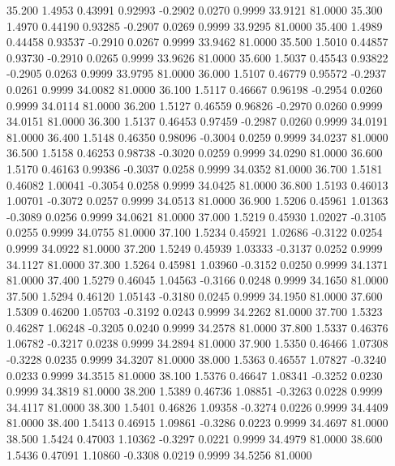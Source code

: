   35.200   1.4953   0.43991   0.92993  -0.2902   0.0270   0.9999  33.9121  81.0000
  35.300   1.4970   0.44190   0.93285  -0.2907   0.0269   0.9999  33.9295  81.0000
  35.400   1.4989   0.44458   0.93537  -0.2910   0.0267   0.9999  33.9462  81.0000
  35.500   1.5010   0.44857   0.93730  -0.2910   0.0265   0.9999  33.9626  81.0000
  35.600   1.5037   0.45543   0.93822  -0.2905   0.0263   0.9999  33.9795  81.0000
  36.000   1.5107   0.46779   0.95572  -0.2937   0.0261   0.9999  34.0082  81.0000
  36.100   1.5117   0.46667   0.96198  -0.2954   0.0260   0.9999  34.0114  81.0000
  36.200   1.5127   0.46559   0.96826  -0.2970   0.0260   0.9999  34.0151  81.0000
  36.300   1.5137   0.46453   0.97459  -0.2987   0.0260   0.9999  34.0191  81.0000
  36.400   1.5148   0.46350   0.98096  -0.3004   0.0259   0.9999  34.0237  81.0000
  36.500   1.5158   0.46253   0.98738  -0.3020   0.0259   0.9999  34.0290  81.0000
  36.600   1.5170   0.46163   0.99386  -0.3037   0.0258   0.9999  34.0352  81.0000
  36.700   1.5181   0.46082   1.00041  -0.3054   0.0258   0.9999  34.0425  81.0000
  36.800   1.5193   0.46013   1.00701  -0.3072   0.0257   0.9999  34.0513  81.0000
  36.900   1.5206   0.45961   1.01363  -0.3089   0.0256   0.9999  34.0621  81.0000
  37.000   1.5219   0.45930   1.02027  -0.3105   0.0255   0.9999  34.0755  81.0000
  37.100   1.5234   0.45921   1.02686  -0.3122   0.0254   0.9999  34.0922  81.0000
  37.200   1.5249   0.45939   1.03333  -0.3137   0.0252   0.9999  34.1127  81.0000
  37.300   1.5264   0.45981   1.03960  -0.3152   0.0250   0.9999  34.1371  81.0000
  37.400   1.5279   0.46045   1.04563  -0.3166   0.0248   0.9999  34.1650  81.0000
  37.500   1.5294   0.46120   1.05143  -0.3180   0.0245   0.9999  34.1950  81.0000
  37.600   1.5309   0.46200   1.05703  -0.3192   0.0243   0.9999  34.2262  81.0000
  37.700   1.5323   0.46287   1.06248  -0.3205   0.0240   0.9999  34.2578  81.0000
  37.800   1.5337   0.46376   1.06782  -0.3217   0.0238   0.9999  34.2894  81.0000
  37.900   1.5350   0.46466   1.07308  -0.3228   0.0235   0.9999  34.3207  81.0000
  38.000   1.5363   0.46557   1.07827  -0.3240   0.0233   0.9999  34.3515  81.0000
  38.100   1.5376   0.46647   1.08341  -0.3252   0.0230   0.9999  34.3819  81.0000
  38.200   1.5389   0.46736   1.08851  -0.3263   0.0228   0.9999  34.4117  81.0000
  38.300   1.5401   0.46826   1.09358  -0.3274   0.0226   0.9999  34.4409  81.0000
  38.400   1.5413   0.46915   1.09861  -0.3286   0.0223   0.9999  34.4697  81.0000
  38.500   1.5424   0.47003   1.10362  -0.3297   0.0221   0.9999  34.4979  81.0000
  38.600   1.5436   0.47091   1.10860  -0.3308   0.0219   0.9999  34.5256  81.0000
